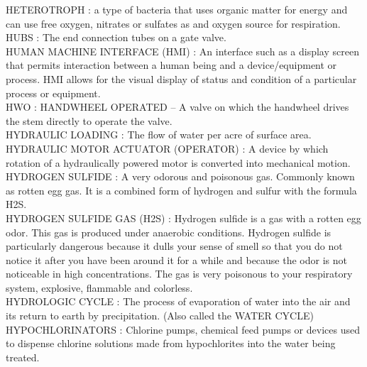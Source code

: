 \vspace{0.15cm}
HETEROTROPH :  a type of bacteria that uses organic matter for energy and can use free oxygen, nitrates or sulfates as and oxygen source for respiration.\\
\vspace{0.15cm}
HUBS :   The end connection tubes on a gate valve.\\
\vspace{0.15cm}
HUMAN MACHINE INTERFACE (HMI) :   An interface such as a display screen that permits interaction between a human being and a device/equipment or process. HMI allows for the visual display of status and condition of a particular process or equipment.\\
\vspace{0.15cm}
HWO :  HANDWHEEL OPERATED –  A valve on which the handwheel drives the stem directly to operate the valve.\\
\vspace{0.15cm}
HYDRAULIC LOADING :  The flow of water per acre of surface area.\\
\vspace{0.15cm}
HYDRAULIC MOTOR ACTUATOR (OPERATOR) :   A device by which rotation of a hydraulically powered motor is converted into mechanical motion.\\
\vspace{0.15cm}
HYDROGEN SULFIDE :  A very odorous and poisonous gas. Commonly known as rotten egg gas. It is a combined form of hydrogen and sulfur with the formula H2S.\\
\vspace{0.15cm}
HYDROGEN SULFIDE GAS (H2S) :  Hydrogen sulfide is a gas with a rotten egg odor. This gas is produced under anaerobic conditions.   Hydrogen sulfide is particularly dangerous because it dulls your sense of smell so that you do not notice it after you have been around it for a while and because the odor is not noticeable in high concentrations. The gas is very poisonous to your respiratory system, explosive, flammable and colorless.\\
\vspace{0.15cm}
HYDROLOGIC CYCLE :  The process of evaporation of water into the air and its return to earth by precipitation. (Also called the WATER CYCLE)\\
\vspace{0.15cm}
HYPOCHLORINATORS :  Chlorine pumps, chemical feed pumps or devices used to dispense chlorine solutions made from hypochlorites into the water being treated.\\
